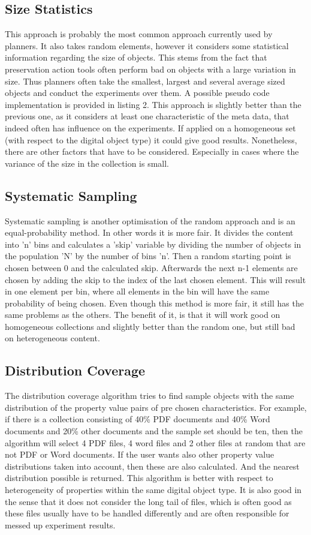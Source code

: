\subsection{Size Statistics}
This approach is probably the most common approach currently used by planners. It also takes random elements, however it considers some statistical information regarding the size of objects. This stems from the fact that preservation action tools often perform bad on objects with a large variation in size. Thus planners often take the smallest, largest and several average sized objects and conduct the experiments over them. A possible pseudo code implementation is provided in listing 2. This approach is slightly better than the previous one, as it considers at least one characteristic of the meta data, that indeed often has influence on the experiments. If applied on a homogeneous set (with respect to the digital object type) it could give good results. Nonetheless, there are other factors that have to be considered. Especially in cases where the variance of the size in the collection is small.

\subsection{Systematic Sampling}
Systematic sampling is another optimisation of the random approach and is an equal-probability method. In other words it is more fair. It divides the content into 'n' bins and calculates a 'skip' variable by dividing the number of objects in the population 'N' by the number of bins 'n'. Then a random starting point is chosen between 0 and the calculated skip. Afterwards the next n-1 elements are chosen by adding the skip to the index of the last chosen element.  This will result in one element per bin, where all elements in the bin will have the same probability of being chosen.
Even though this method is more fair, it still has the same problems as the others. The benefit of it, is that it will work good on homogeneous collections and slightly better than the random one, but still bad on heterogeneous content.

\subsection{Distribution Coverage}
The distribution coverage algorithm tries to find sample objects with the same distribution of the property value pairs of pre chosen characteristics. For example, if there is a collection consisting of 40\% PDF documents and 40\% Word documents and 20\% other documents and the sample set should be ten, then the algorithm will select 4 PDF files, 4 word files and 2 other files at random that are not PDF or Word documents.
If the user wants also other property value distributions taken into account, then these are also calculated. And the nearest distribution possible is returned.
This algorithm is better with respect to heterogeneity of properties within the same digital object type. It is also good in the sense that it does not consider the long tail of files, which is often good as these files usually have to be handled differently and are often responsible for messed up experiment results.

